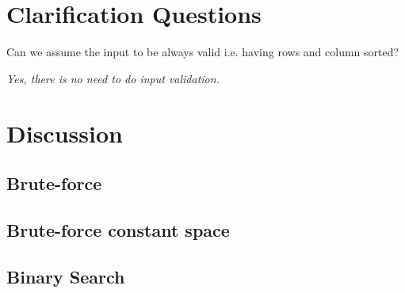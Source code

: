 \section{Clarification Questions}

\begin{QandA}
	\item Can we assume the input to be always valid i.e. having rows and column sorted?
	\begin{answered}
		\textit{Yes, there is no need to do input validation.}
	\end{answered}
	
	
\end{QandA}

\section{Discussion}
\label{kth_smallest_in_sorted_matrix:sec:discussion}


\subsection{Brute-force}
\label{kth_smallest_in_sorted_matrix:sec:bruteforce}



\subsection{Brute-force constant space}
\label{kth_smallest_in_sorted_matrix:sec:bruteforce_constant_space}




\subsection{Binary Search}
\label{kth_smallest_in_sorted_matrix:sec:binarysearch}


